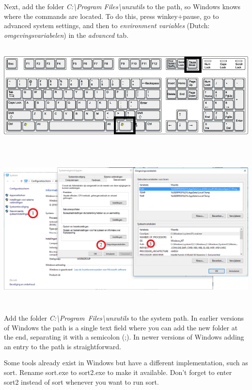 \documentclass[a4paper]{report}
\begin{document}
Next, add the folder \textit{C:{\textbackslash}Program
Files{\textbackslash}unxutils} to the path, so Windows knows where the
commands are located. To do this, press winkey+pause, go to advanced
system settings, and then to \textit{environment variables} (Dutch:
\textit{omgevingsvariabelen}) in the \textit{advanced} tab.

\noindent\begin{center}\includegraphics[width=6.5in,height=2.0846in]{Syllabus-img2.png}
\end{center}

\noindent\begin{center}\includegraphics[width=6.4866in,height=3.2535in]{Syllabus-img3.png}
\end{center}

Add the folder \textit{C:{\textbackslash}Program~Files{\textbackslash}unxutils}
to the system path. In earlier versions
of Windows the path is a single text field where you can add the new
folder at the end, separating it with a semicolon (;). In newer
versions of Windows adding an entry to the path is straightforward.

Some tools already exist in Windows but have a different implementation,
such as sort. Rename sort.exe to sort2.exe to make it available.
Don{\textquoteright}t forget to enter sort2 instead of sort whenever
you want to run sort.
\end{document}
